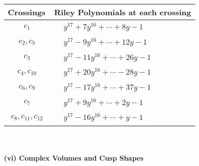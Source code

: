\documentclass[1p]{elsarticle_modified}
\theoremstyle{definition}
\begin{document}
\begin{tabular}{m{50pt}|m{274pt}}
Crossings & \hspace{64pt}Riley Polynomials at each crossing \\
\hline $$\begin{aligned}c_{1}\end{aligned}$$&$\begin{aligned}
&y^{17}+7 y^{16}+\cdots+8 y-1
\end{aligned}$\\
\hline $$\begin{aligned}c_{2},c_{5}\end{aligned}$$&$\begin{aligned}
&y^{17}-9 y^{16}+\cdots+12 y-1
\end{aligned}$\\
\hline $$\begin{aligned}c_{3}\end{aligned}$$&$\begin{aligned}
&y^{17}-11 y^{16}+\cdots+26 y-1
\end{aligned}$\\
\hline $$\begin{aligned}c_{4},c_{10}\end{aligned}$$&$\begin{aligned}
&y^{17}+20 y^{16}+\cdots-28 y-1
\end{aligned}$\\
\hline $$\begin{aligned}c_{6},c_{9}\end{aligned}$$&$\begin{aligned}
&y^{17}-17 y^{16}+\cdots+37 y-1
\end{aligned}$\\
\hline $$\begin{aligned}c_{7}\end{aligned}$$&$\begin{aligned}
&y^{17}+9 y^{16}+\cdots+2 y-1
\end{aligned}$\\
\hline $$\begin{aligned}c_{8},c_{11},c_{12}\end{aligned}$$&$\begin{aligned}
&y^{17}-16 y^{16}+\cdots+y-1
\end{aligned}$\\
\hline
\end{tabular}\\~\\
\newpage\flushleft \textbf{(vi) Complex Volumes and Cusp Shapes}
\end{document}

